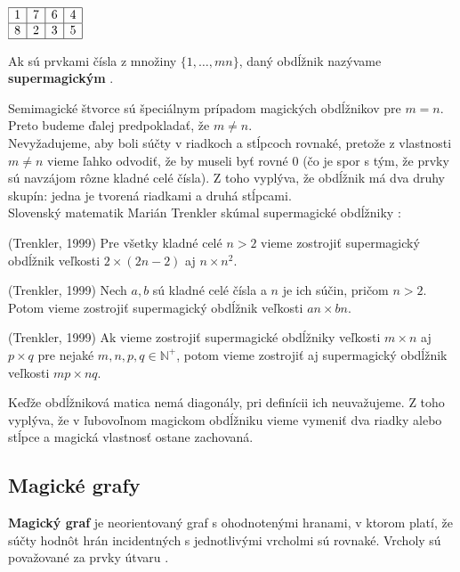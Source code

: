 \begin{center}
$\begin{array}{ |c|c|c|c| } 
\hline
1 & 7 & 6 & 4 \\ 
\hline
8 & 2 & 3 & 5 \\
\hline
\end{array}$
\end{center}

\begin{definition} Ak sú prvkami čísla z množiny $\{1, \dots, mn\}$, daný obdĺžnik nazývame \textbf{supermagickým} \cite{rectangles}.
\end{definition}

Semimagické štvorce sú špeciálnym prípadom magických obdĺžnikov pre $m = n$. Preto budeme ďalej predpokladať, že $m \neq n$. \\

Nevyžadujeme, aby boli súčty v riadkoch a stĺpcoch rovnaké, pretože z vlastnosti $m \neq n$ vieme ľahko odvodiť, že by museli byť rovné $0$ (čo je spor s tým, že prvky sú navzájom rôzne kladné celé čísla). Z toho vyplýva, že obdĺžnik má dva druhy skupín: jedna je tvorená riadkami a druhá stĺpcami. \\

Slovenský matematik Marián Trenkler skúmal supermagické obdĺžniky \cite{rectangles}:

\begin{theorem} (Trenkler, 1999) Pre všetky kladné celé $n > 2$ vieme zostrojiť supermagický obdĺžnik veľkosti $2 \times (2n - 2)$ aj $n \times n^2$.
\end{theorem}

\begin{theorem} (Trenkler, 1999) Nech $a,b$ sú kladné celé čísla a $n$ je ich súčin, pričom $n > 2$. Potom vieme zostrojiť supermagický obdĺžnik veľkosti $an \times bn$.
\end{theorem}

\begin{theorem} (Trenkler, 1999) Ak vieme zostrojiť supermagické obdĺžniky veľkosti $m \times n$ aj $p \times q$ pre nejaké $m,n,p,q \in \mathbb{N^+}$, potom vieme zostrojiť aj supermagický obdĺžnik veľkosti $mp \times nq$.
\end{theorem}

Keďže obdĺžniková matica nemá diagonály, pri definícii ich neuvažujeme. Z toho vyplýva, že v ľubovoľnom magickom obdĺžniku vieme vymeniť dva riadky alebo stĺpce a magická vlastnosť ostane zachovaná.

\subsection{Magické grafy}
\begin{definition} \textbf{Magický graf} je neorientovaný graf s ohodnotenými hranami, v ktorom platí, že súčty hodnôt hrán incidentných s jednotlivými vrcholmi sú rovnaké. Vrcholy sú považované za prvky útvaru \cite{antimagic}.
\end{definition}

